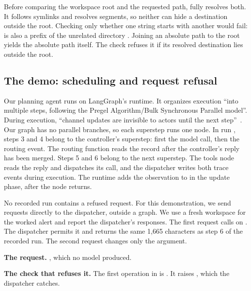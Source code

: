Before comparing the workspace root and the requested path,  fully
resolves both. It follows symlinks and resolves  segments, so neither can hide a
destination outside the root. Checking only whether one string starts with another would fail:
 is also a prefix of the unrelated directory . Joining an
absolute path to the root yields the absolute path itself. The check refuses it if its resolved
destination lies outside the root.

\subsection{The demo: scheduling and request refusal}
\label{sec:boundary-demo}

Our planning agent runs on LangGraph's runtime. It organizes execution ``into multiple steps, following
the Pregel Algorithm/Bulk Synchronous Parallel model''. During execution, ``channel updates are invisible to actors until the next step''~\citep{langgraph-pregel}.
Our graph has no parallel branches, so each superstep runs one node. In run ,
steps 3 and 4 belong to the controller's superstep: first the model call, then the routing event.
The routing function reads the record after the controller's reply has been merged. Steps 5 and
6 belong to the next superstep. The tools node reads the reply and dispatches its call, and the
dispatcher writes both trace events during execution. The runtime adds the observation to
 in the update phase, after the node returns.

No recorded run contains a refused request. For this demonstration, we send requests directly to
the dispatcher, outside a graph. We use a fresh workspace for the worked alert and report the
dispatcher's responses. The first request calls  on
. The dispatcher permits it and returns the same 1,665
characters as step 6 of the recorded run. The second request changes only the argument.

\bi

\item \textbf{The request.} , which no model produced.

\item \textbf{The check that refuses it.} The first operation in  is
. It raises , which the dispatcher catches.

